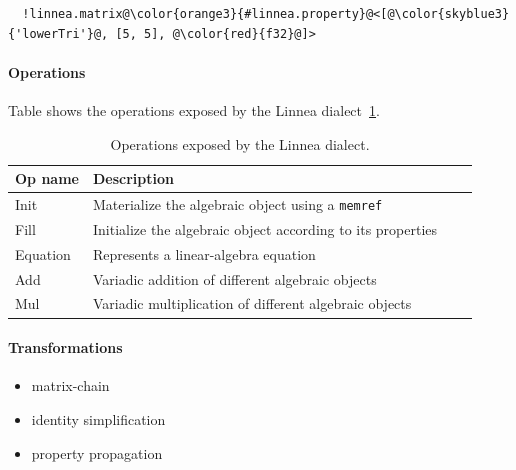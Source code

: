 \documentclass[conference]{IEEEtran}
\begin{document}
\begin{listing}[]
\begin{center}
\begin{minipage}[]{0.5\textwidth}
\begin{verbatim}
  !linnea.matrix@\color{orange3}{#linnea.property}@<[@\color{skyblue3}{'lowerTri'}@, [5, 5], @\color{red}{f32}@]>
\end{verbatim}
\end{minipage}
  \caption{A type to represent a 5 $\times$ 5 lower-triangular matrix with \texttt{f32} as element type.}
\label{lst:type}
\end{center}
\end{listing}

\paragraph{Operations}
Table shows the operations exposed by the Linnea dialect~\ref{table:operations}.

\begin{table}
\begin{center}
\begin{tabular}{llll}
    \toprule
    \footnotesize{Op name}     & \footnotesize{Description} \\ \midrule
    \footnotesize{Init} & \footnotesize{Materialize the algebraic object using a \texttt{memref}} \\
    \rowcolor{aluminium1}
    \footnotesize{Fill} & \footnotesize{Initialize the algebraic object according to its properties}  \\
    \rowcolor{aluminium1}
    \footnotesize{Equation} & \footnotesize{Represents a linear-algebra equation} \\
    \footnotesize{Add} & \footnotesize{Variadic addition of different algebraic objects} \\
    \rowcolor{aluminium1}
    \footnotesize{Mul} & \footnotesize{Variadic multiplication of different algebraic objects} \\ \bottomrule
\end{tabular}
\end{center}
\caption{Operations exposed by the Linnea dialect.}
\label{table:operations}
\end{table} 

\paragraph{Transformations}
\begin{itemize}
  \item matrix-chain
  \item identity simplification
  \item property propagation
\end{itemize}
\end{document}
